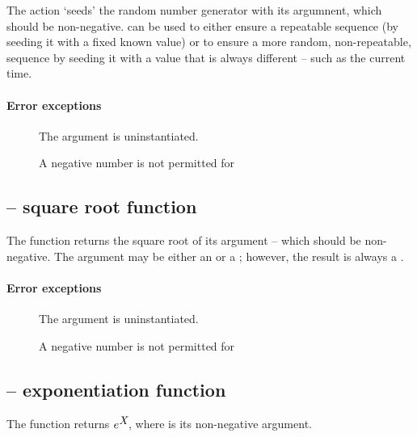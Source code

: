 The  action `seeds' the random number generator with its  argumnent, which should be non-negative.  can be used to either ensure a repeatable sequence (by seeding it with a fixed known value) or to ensure a more random, non-repeatable, sequence by seeding it with a value that is always different -- such as the current time.
        
\paragraph{Error exceptions}
\begin{description}
\item[]
The argument is uninstantiated.
\item[]
A negative number is not permitted for 
\end{description}

\subsection{ -- square root function}
\label{arith:sqrt}

     
The  function returns the square root of its argument -- which should be non-negative. The argument may be either an  or a ; however, the result is always a .
        
\paragraph{Error exceptions}
\begin{description}
\item[]
The argument is uninstantiated.
\item[]
A negative number is not permitted for 
\end{description}

\subsection{ -- exponentiation function}
\label{arith:exp}

     
The  function returns $e^{{\mbox{\rm\em X}}}$, where  is its non-negative argument.
        
